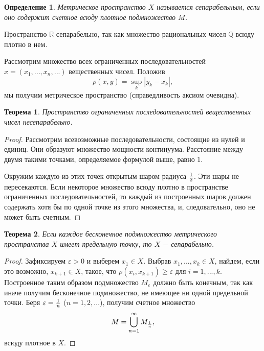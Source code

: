 \documentclass{article}
\newtheorem{theorem}{Теорема}[section]
\newtheorem{definition}{Определение}[section]
\begin{document}
\begin{definition}
Метрическое пространство \(X\) называется сепарабельным, если оно содержит счетное всюду плотное подмножество \(M\).
\end{definition}

Пространство \(\mathbb{R}\) сепарабельно, так как множество рациональных чисел \(\mathbb{Q}\) всюду плотно в нем. \newline

Рассмотрим множество всех ограниченных последовательностей \(x = (x_1, ..., x_n, ...)\) вещественных чисел. Положив
\[
\rho(x, y) = \sup\limits_{k} |y_k - x_k|,
\]
мы получим метрическое пространство (справедливость аксиом очевидна).

\begin{theorem}
Пространство ограниченных последовательностей вещественных чисел несепарабельно.
\end{theorem}

\begin{proof}
Рассмотрим всевозможные последовательности, состоящие из нулей и единиц. Они образуют множество мощности континуума. Расстояние между двумя такими точками, определяемое формулой выше, равно \(1\).

Окружим каждую из этих точек открытым шаром радиуса \({1} \over {2}\). Эти шары не пересекаются. Если некоторое множество всюду плотно в пространстве ограниченных последовательностей, то каждый из построенных шаров должен содержать хотя бы по одной точке из этого множества, и, следовательно, оно не может быть счетным.
\end{proof}

\begin{theorem}
Если каждое бесконечное подмножество метрического пространства \(X\) имеет предельную точку, то \(X\) \(-\) сепарабельно.
\end{theorem}

\begin{proof}
Зафиксируем \(\varepsilon > 0\) и выберем \(x_1 \in X\). Выбрав \(x_1, ..., x_{k} \in X\), найдем, если это возможно, \(x_{k + 1} \in X\), такое, что \(\rho(x_i, x_{k + 1}) \geq \varepsilon\) для \(i = 1, ..., k\). Построенное таким образом подмножество \(M_{\varepsilon}\) должно быть конечным, так как иначе получим бесконечное подмножество, не имеющее ни одной предельной точки. Беря \(\varepsilon = {1 \over n}\) (\(n = 1, 2, ...\)), получим счетное множество
\[
M = \bigcup\limits_{n=1}^{\infty}{M_{1 \over n}},
\]
всюду плотное в \(X\).
\end{proof}
\end{document}
